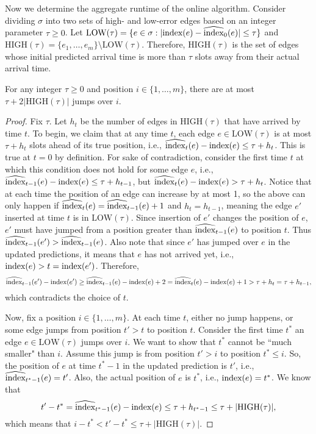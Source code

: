Now we determine the aggregate runtime of the online algorithm. Consider dividing $\sigma$ into two sets of high- and low-error edges based on an integer parameter $\tau \geq 0$.  Let $\text{LOW}(\tau) = \{e \in \sigma : |\text{index}(e) - \widehat{\text{index}}_0(e)| \leq \tau\}$ and $\text{HIGH}(\tau) =  \{e_1, \ldots, e_m\} \setminus \text{LOW}(\tau)$. 
Therefore, $\text{HIGH}(\tau)$ is the set of edges whose initial predicted arrival time is more than $\tau$ slots away from their actual arrival time.

\begin{lemma}
\label{lem:jump}
    For any integer $\tau\geq 0$ and  position $i \in \{1,\ldots,m\}$, there are at most $\tau + 2|\text{HIGH}(\tau)|$ jumps over $i$.
\end{lemma}

\begin{proof}
    Fix $\tau$. 
    Let $h_t$ be the number of edges in $\text{HIGH}(\tau)$ that have arrived by time $t$. 
    To begin, we claim that at any time $t$, each edge $e \in \text{LOW}(\tau)$ is at most $\tau + h_t$ slots ahead of its true position, i.e., $\widehat{\text{index}}_{t}(e) - \text{index}(e) \leq \tau + h_t$.
    This is true at $t = 0$ by definition. 
    For sake of contradiction, consider the first time $t$ at which this condition does not hold for some edge $e$, i.e., $\widehat{\text{index}}_{t-1}(e) - \text{index}(e) \leq \tau + h_{t-1}$, but $\widehat{\text{index}}_{t}(e) - \text{index}(e) > \tau + h_t$. 
    Notice that at each time the position of an edge can increase by at most 1, so the above can only happen if $\widehat{\text{index}}_{t}(e) = \widehat{\text{index}}_{t-1}(e) + 1$ and $h_t = h_{t-1}$, meaning the edge $e'$ inserted at time $t$ is in $\text{LOW}(\tau)$. Since insertion of $e'$ changes the position of $e$, $e'$ must have jumped from a position greater than $\widehat{\text{index}}_{t-1}(e)$ to position $t$. 
    Thus $\widehat{\text{index}}_{t-1}(e')>\widehat{\text{index}}_{t-1}(e)$. 
    Also note that since $e'$ has jumped over $e$ in the updated predictions, it means that $e$ has not arrived yet, i.e., $\text{index}(e)>t=\text{index}(e')$.
    Therefore, 
    \[
    \widehat{\text{index}}_{t-1}(e') - \text{index}(e') \geq \widehat{\text{index}}_{t-1}(e) - \text{index}(e) +2 = \widehat{\text{index}}_{t}(e) - \text{index}(e)+1 > \tau + h_t = \tau + h_{t-1},\]
    which contradicts the choice of $t$. 
    
    Now, fix a position $i\in \{1,\ldots,m\}$. 
    At each time $t$, either no jump happens, or some edge jumps from position $t' > t$ to position $t$.
    Consider the first time $t^*$ an edge $e \in \text{LOW}(\tau)$ jumps over $i$.
    We want to show that $t^*$ cannot be ``much smaller" than $i$.
    Assume this jump is from position $t' > i$ to position $t^* \leq i$.
    So, the position of $e$ at time $t^*-1$ in the updated prediction is $t'$, i.e., $\widehat{\text{index}}_{t^*-1}(e)=t'$.
    Also, the actual position of $e$ is $t^*$, i.e., $\text{index}(e)=t^*$.
    We know that 
    \[t'-t^*=\widehat{\text{index}}_{t^*-1}(e)-\text{index}(e) \leq \tau + h_{t^*-1}\leq \tau+|\text{HIGH}(\tau)|,\]
    which means that $i-t^*<t'-t^*\leq \tau+|\text{HIGH}(\tau)|$.
    

\end{proof}
